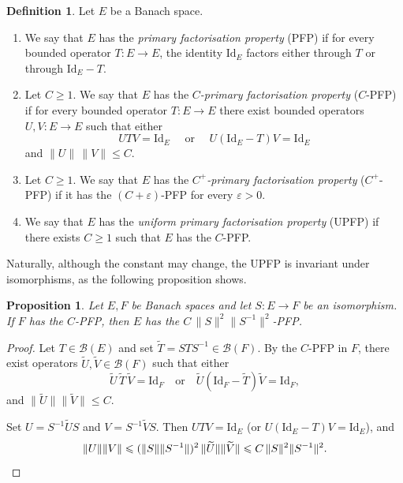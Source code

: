 \documentclass[11pt]{amsart}
\theoremstyle{plain}
\newtheorem{proposition}[theorem]{Proposition}
\theoremstyle{definition}
\newtheorem{definition}[theorem]{Definition}
\numberwithin{equation}{section}
\newcommand{\norm}[1]{\lVert #1 \rVert}
\newcommand{\Bop}{\mathcal{B}}
\newcommand{\Id}{\mathrm{Id}}
\renewcommand{\le}{\leqslant}
\renewcommand{\geq}{\geqslant}
\begin{document}
\begin{definition}
Let $E$ be a Banach space.

\begin{enumerate}[label = (\alph*), ref = (\alph*)]
    \item \label{def: PFP} We say that $E$ has the \emph{primary factorisation property} (PFP) if for every bounded operator $T \colon E \to E$, the identity $\Id_E$ factors either through $T$ or through $\Id_E - T$.
    \item Let $C \geq 1$. We say that $E$ has the \emph{$C$-primary factorisation property} ($C$-PFP) if for every bounded operator $T \colon E \to E$ there exist bounded operators $U, V \colon E \to E$ such that either
    \begin{equation*}
        UTV = \Id_E \quad \text{ or } \quad U(\Id_E - T)V = \Id_E
    \end{equation*}
    and $\norm{U}\,\norm{V} \le C.$
    \item Let $C \geq 1$. We say that $E$ has the \emph{$C^{+}$-primary factorisation property} ($C^{+}$-PFP) if it has the $(C+\varepsilon)$-PFP for every $\varepsilon > 0$.
    \item We say that $E$ has the \emph{uniform primary factorisation property} (UPFP) if there exists $C \geq 1$ such that $E$ has the $C$-PFP.
\end{enumerate}
\end{definition}

Naturally, although the constant may change, the UPFP is invariant under isomorphisms, as the following proposition shows.

\begin{proposition}\label{prop:iso-invariance}
    Let $E, F$ be Banach spaces and let $S \colon E \to F$ be an isomorphism.
    If $F$ has the $C$-PFP, then $E$ has the $C\,\norm{S}^2 \norm{S^{-1}}^2$-PFP.
\end{proposition}

\begin{proof}
    Let $T \in \Bop(E)$ and set $\widetilde T = S T S^{-1} \in \Bop(F)$.
    By the $C$-PFP in $F$, there exist operators $\widetilde U, \widetilde V \in \Bop(F)$ such that either
    \begin{equation*}
    \widetilde U\,\widetilde T\,\widetilde V = \Id_F
    \quad \text{or} \quad
    \widetilde U(\Id_F - \widetilde T)\widetilde V = \Id_F,
    \end{equation*}
    and $\norm{\widetilde U}\norm{\widetilde V} \le C$.
    
    Set $U = S^{-1}\widetilde U S$ and $V = S^{-1}\widetilde V S$.
    Then $UTV = \Id_E$ (or $U(\Id_E - T)V = \Id_E$), and
    \begin{equation*}
    \norm{U}\norm{V}
    \le (\norm{S}\norm{S^{-1}})^2\,\norm{\widetilde U}\norm{\widetilde V}
    \le C\,\norm{S}^2 \norm{S^{-1}}^2.\qedhere
    \end{equation*}
\end{proof}
\end{document}
